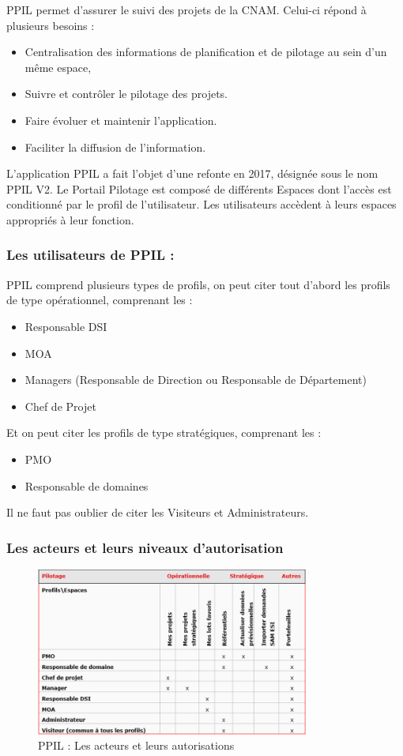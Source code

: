 PPIL permet d'assurer le suivi des projets de la CNAM.
Celui-ci répond à plusieurs besoins :
\begin{itemize}
    \item Centralisation des informations de planification et de pilotage  au sein d’un même espace,
    \item Suivre et contrôler le pilotage des projets.
    \item Faire évoluer et maintenir l'application.
    \item Faciliter la diffusion de l’information.
\end{itemize}
L'application PPIL a fait l'objet d'une refonte en 2017, désignée sous le nom PPIL V2. 
Le Portail Pilotage est composé de différents Espaces dont l’accès est conditionné par le profil de l’utilisateur. Les utilisateurs accèdent à leurs espaces appropriés à leur fonction.

\subsubsection{Les utilisateurs de PPIL :}
PPIL comprend plusieurs types de profils, on peut citer tout d'abord les profils de type opérationnel, comprenant les : 
\begin{itemize}
    \item Responsable DSI
    \item MOA
    \item Managers (Responsable de Direction ou Responsable de Département) 
    \item Chef de Projet
\end{itemize}
Et on peut citer les profils de type stratégiques, comprenant les :
\begin{itemize}
    \item PMO
    \item Responsable de domaines
\end{itemize}
\vspace{\baselineskip}
Il ne faut pas oublier de citer les Visiteurs et Administrateurs.

\subsubsection{Les acteurs et leurs niveaux d'autorisation}
\begin{figure}[!h]
\centering
\includegraphics[width=0.8\textwidth]{images/ppil acteurs.png}
\caption{PPIL : Les acteurs et leurs autorisations}
\end{figure}

